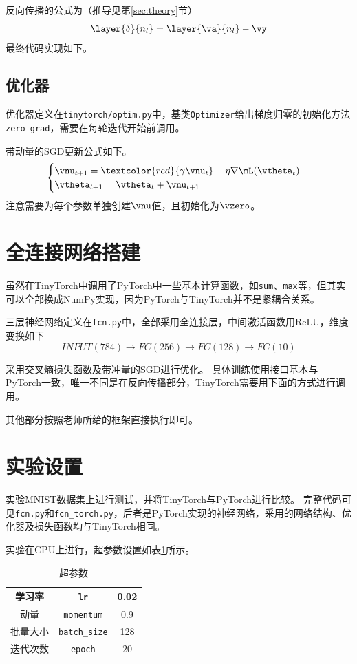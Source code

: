 \documentclass[logo,reportComp]{thesis}
\begin{document}
反向传播的公式为（推导见第\ref{sec:theory}节）
\[\layer{\tilde{\delta}}{n_l}=\layer{\va}{n_l}-\vy\]
最终代码实现如下。


\subsection{优化器}
优化器定义在\verb'tinytorch/optim.py'中，基类\verb'Optimizer'给出梯度归零的初始化方法\verb'zero_grad'，需要在每轮迭代开始前调用。

带动量的SGD更新公式如下。
\[\begin{cases}
    \vnu_{t+1}=\textcolor{red}{\gamma\vnu_t}-\eta\nabla\mL(\vtheta_t)\\
    \vtheta_{t+1}=\vtheta_t+\vnu_{t+1}
\end{cases}\]
注意需要为每个参数单独创建$\vnu$值，且初始化为$\vzero$。


\section{全连接网络搭建}
虽然在TinyTorch中调用了PyTorch中一些基本计算函数，如\verb'sum'、\verb'max'等，但其实可以全部换成NumPy实现，因为PyTorch与TinyTorch并不是紧耦合关系。

三层神经网络定义在\verb'fcn.py'中，全部采用全连接层，中间激活函数用ReLU，维度变换如下
\[INPUT(784)\to FC(256)\to FC(128)\to FC(10)\]


采用交叉熵损失函数及带冲量的SGD进行优化。
具体训练使用接口基本与PyTorch一致，唯一不同是在反向传播部分，TinyTorch需要用下面的方式进行调用。

其他部分按照老师所给的框架直接执行即可。

\section{实验设置}
实验MNIST数据集上进行测试，并将TinyTorch与PyTorch进行比较。
完整代码可见\verb'fcn.py'和\verb'fcn_torch.py'，后者是PyTorch实现的神经网络，采用的网络结构、优化器及损失函数均与TinyTorch相同。

实验在CPU上进行，超参数设置如表\ref{tab:hyper}所示。
\begin{table}[H]
\centering
\caption{超参数}
\label{tab:hyper}
\begin{tabular}{|c|c|c|}\hline
学习率 & \verb'lr' & 0.02 \\\hline
动量 & \verb'momentum' & 0.9 \\\hline
批量大小 & \verb'batch_size' & 128 \\\hline
迭代次数 & \verb'epoch' & 20 \\\hline
\end{tabular}
\end{table}
\end{document}
